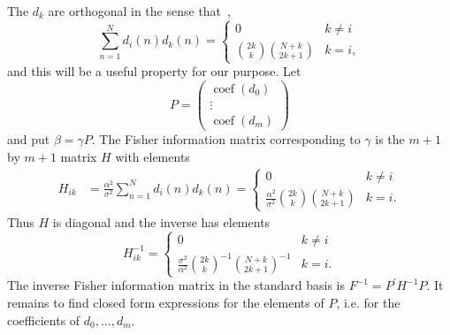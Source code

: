 \documentclass[review]{elsarticle}
\newcommand{\coef}{\operatorname{coef}}
\begin{document}
The $d_k$ are orthogonal in the sense that~\cite{Eisinberg2007_discerete_otho_poly_equidist},
\[
\sum_{n=1}^{N}{ d_i(n) d_k(n) } = \begin{cases}
0 &  k\neq i \\
\binom{2k}{k} \binom{N+k}{2k+1}  & k = i,
\end{cases}
\]
and this will be a useful property for our purpose.  Let 
\[
P = \left( \begin{array}{c}
\coef(d_0) \\
\vdots \\
\coef(d_m)
\end{array} \right)
\]
and put $\beta = \gamma P$.  The Fisher information matrix corresponding to $\gamma$ is the $m+1$ by $m+1$ matrix $H$ with elements
\begin{align*}
H_{ik} &= \frac{\alpha^2}{\sigma^2}\sum_{n=1}^{N} d_{i}(n) d_{k}(n) 
= \begin{cases}
0 &  k\neq i \\
 \frac{\alpha^2}{\sigma^2} \binom{2k}{k} \binom{N+k}{2k+1}  & k = i.
\end{cases}
\end{align*}
Thus $H$ is diagonal and the inverse has elements
\[
H_{ik}^{-1} = \begin{cases}
0 &  k\neq i \\
 \frac{\sigma^2}{\alpha^2} \binom{2k}{k}^{-1} \binom{N+k}{2k+1}^{-1}  & k = i.
\end{cases}
\] 
The inverse Fisher information matrix in the standard basis is $F^{-1} = P^\prime H^{-1} P$.  It remains to find closed form expressions for the elements of $P$, i.e. for the coefficients of $d_0,\dots,d_m$.  

\newcommand{\stirling}[2]{\genfrac{[}{]}{0pt}{}{#1}{#2}}

\end{document}
